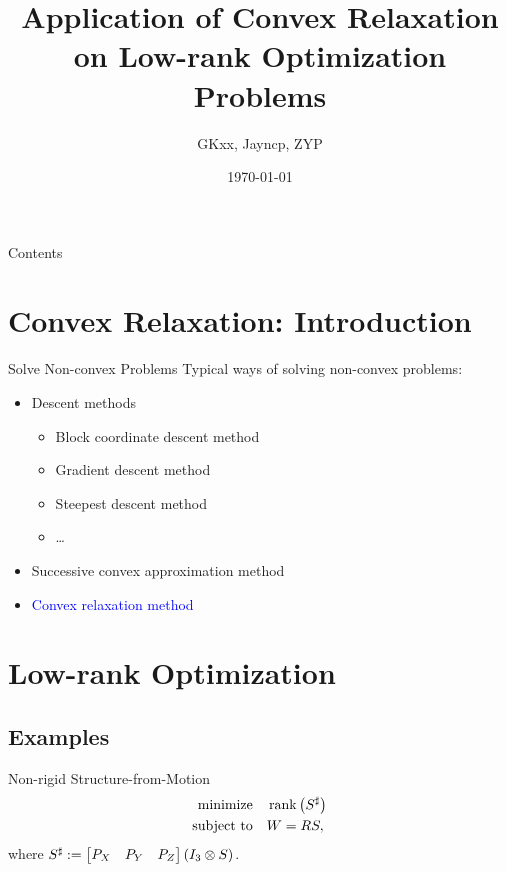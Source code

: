 \documentclass{beamer}
\title{Application of Convex Relaxation on Low-rank Optimization Problems}
\author{GKxx, Jayncp, ZYP}
\date{\today}
\newcommand{\blue}[1]{\textcolor{blue}{#1}}
\begin{document}
\begin{frame}
    \maketitle
\end{frame}

\begin{frame}{Contents}
    \tableofcontents
\end{frame}

\section{Convex Relaxation: Introduction}

\begin{frame}{Solve Non-convex Problems}
    Typical ways of solving non-convex problems:
    \begin{itemize}
        \item Descent methods
        \begin{itemize}
            \item Block coordinate descent method
            \item Gradient descent method
            \item Steepest descent method
            \item \dots
        \end{itemize}
        \item Successive convex approximation method
        \item \blue{Convex relaxation method}
    \end{itemize}
\end{frame}

\section{Low-rank Optimization}

\subsection{Examples}

\begin{frame}{Non-rigid Structure-from-Motion}
    \[\begin{aligned}
        \textnormal{minimize}\quad & \operatorname{rank}\left(S^\sharp\right)\\
        \textnormal{subject to}\quad & W=RS,
    \end{aligned}\]
    where \(S^\sharp:=\begin{bmatrix}P_X & P_Y & P_Z\end{bmatrix}\left(I_3\otimes S\right)\).
\end{frame}
\end{document}
